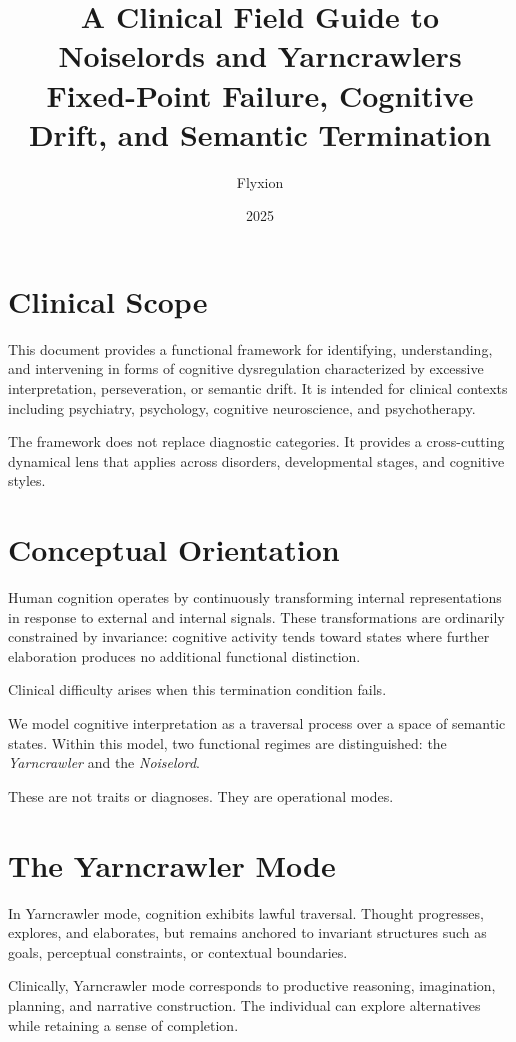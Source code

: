 \documentclass[12pt]{article}
\title{\textbf{A Clinical Field Guide to Noiselords and Yarncrawlers}\\
\large Fixed-Point Failure, Cognitive Drift, and Semantic Termination}
\author{Flyxion}
\date{2025}
\begin{document}
\maketitle

\section*{Clinical Scope}

This document provides a functional framework for identifying, understanding, and intervening in forms of cognitive dysregulation characterized by excessive interpretation, perseveration, or semantic drift. It is intended for clinical contexts including psychiatry, psychology, cognitive neuroscience, and psychotherapy.

The framework does not replace diagnostic categories. It provides a cross-cutting dynamical lens that applies across disorders, developmental stages, and cognitive styles.

\section{Conceptual Orientation}

Human cognition operates by continuously transforming internal representations in response to external and internal signals. These transformations are ordinarily constrained by invariance: cognitive activity tends toward states where further elaboration produces no additional functional distinction.

Clinical difficulty arises when this termination condition fails.

We model cognitive interpretation as a traversal process over a space of semantic states. Within this model, two functional regimes are distinguished: the \emph{Yarncrawler} and the \emph{Noiselord}.

These are not traits or diagnoses. They are operational modes.

\section{The Yarncrawler Mode}

In Yarncrawler mode, cognition exhibits lawful traversal. Thought progresses, explores, and elaborates, but remains anchored to invariant structures such as goals, perceptual constraints, or contextual boundaries.

Clinically, Yarncrawler mode corresponds to productive reasoning, imagination, planning, and narrative construction. The individual can explore alternatives while retaining a sense of completion.
\end{document}
